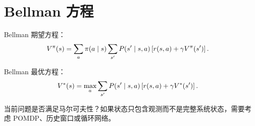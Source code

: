 \section{Bellman 方程}

Bellman 期望方程：
\[
  V^{\pi}(s)=
  \sum_a \pi(a\mid s)
  \sum_{s'} P(s'\mid s,a)
  \left[r(s,a)+\gamma V^{\pi}(s')\right].
\]

Bellman 最优方程：
\[
  V^*(s)=
  \max_a \sum_{s'} P(s'\mid s,a)
  \left[r(s,a)+\gamma V^*(s')\right].
\]

\begin{questionbox}
当前问题是否满足马尔可夫性？如果状态只包含观测而不是完整系统状态，需要考虑 POMDP、历史窗口或循环网络。
\end{questionbox}
